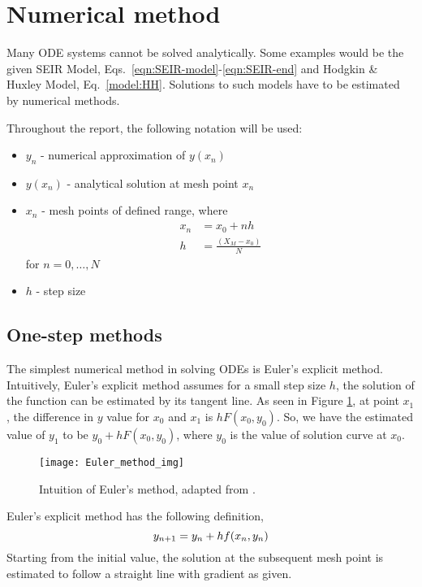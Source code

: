 \section{Numerical method}
Many ODE systems cannot be solved analytically. Some examples would be the given SEIR Model, Eqs.~\eqref{eqn:SEIR-model}-\eqref{eqn:SEIR-end} and Hodgkin \& Huxley Model, Eq.~\eqref{model:HH}. Solutions to such models have to be estimated by numerical methods.

Throughout the report, the following notation will be used:
\begin{itemize}
    \item $y_n$ - numerical approximation of $y(x_n)$
    \item $y(x_n)$ - analytical solution at mesh point $x_n$
    \item $x_n$ - mesh points of defined range, where
        \begin{align}
            x_n &= x_0 + nh\\
            h &= \frac{(X_M - x_0)}{N}
        \end{align}
        for $n = 0,\dots, N$
    \item $h$ - step size
\end{itemize}

\subsection{One-step methods}
\label{subsec:one-step-method}
The simplest numerical method in solving ODEs is Euler's explicit method. Intuitively, Euler's explicit method assumes for a small step size $h$, the solution of the function can be estimated by its tangent line. As seen in Figure \ref{fig:Euler_method}, at point $x_1$, the difference in $y$ value for $x_0$ and $x_1$ is $hF(x_0,y_0)$. So, we have the estimated value of $y_1$ to be $y_0 + hF(x_0,y_0)$, where $y_0$ is the value of solution curve at $x_0$.

\begin{figure}
\centering
    \texttt{[image: Euler\_method\_img]}
    \caption{Intuition of Euler's method, adapted from \cite{CalcWorkshop2019}.}
    \label{fig:Euler_method}
\end{figure}

Euler's explicit method has the following definition,  
\begin{equation}
    y_{n+1} = y_n + hf(x_n,y_n)\\
\end{equation}
Starting from the initial value, the solution at the subsequent mesh point is estimated to follow a straight line with gradient as given.

